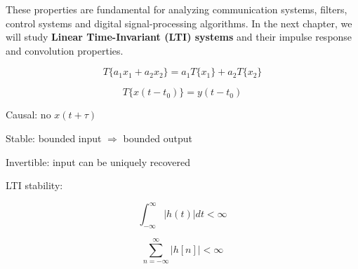 These properties are fundamental for analyzing communication systems, filters,
control systems and digital signal-processing algorithms. In the next chapter,
we will study \textbf{Linear Time-Invariant (LTI) systems} and their impulse
response and convolution properties.


\begin{tcolorbox}[title=One-Minute Revision,colback=blue!5]

\[
T\{a_1x_1+a_2x_2\}=a_1T\{x_1\}+a_2T\{x_2\}
\]

\[
T\{x(t-t_0)\}=y(t-t_0)
\]

Causal: no \(x(t+\tau)\)

Stable: bounded input \(\Rightarrow\) bounded output

Invertible: input can be uniquely recovered

LTI stability:

\[
\int_{-\infty}^{\infty}|h(t)|dt<\infty
\]

\[
\sum_{n=-\infty}^{\infty}|h[n]|<\infty
\]

\end{tcolorbox}
